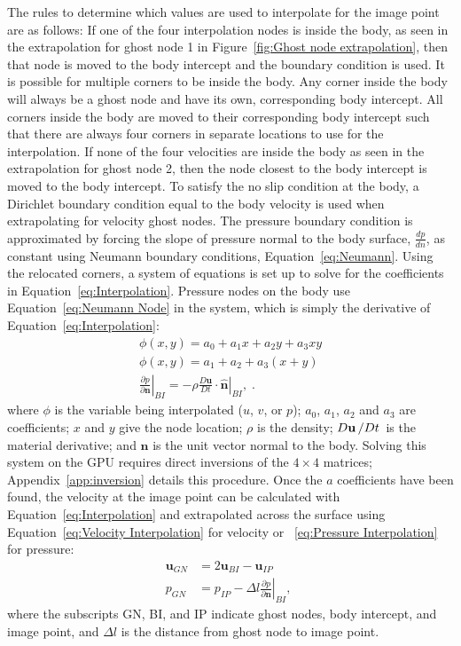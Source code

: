 \documentclass[preprint,12pt]{elsarticle}
\begin{document}
The rules to determine which values are used to interpolate for the image point are as follows:
If one of the four interpolation nodes is inside the body, as seen in the extrapolation for ghost node 1 in Figure~\ref{fig:Ghost node extrapolation}, then that node is moved to the body intercept and the boundary condition is used.
It is possible for multiple corners to be inside the body.
Any corner inside the body will always be a ghost node and have its own, corresponding body intercept.
All corners inside the body are moved to their corresponding body intercept such that there are always four corners in separate locations to use for the interpolation.
If none of the four velocities are inside the body as seen in the extrapolation for ghost node 2, then the node closest to the body intercept is moved to the body intercept.
To satisfy the no slip condition at the body, a Dirichlet boundary condition equal to the body velocity is used when extrapolating for velocity ghost nodes.
The pressure boundary condition is approximated by forcing the slope of pressure normal to the body surface, $\frac{dp}{dn}$, as constant using Neumann boundary conditions, Equation~\eqref{eq:Neumann}.
Using the relocated corners, a system of equations is set up to solve for the coefficients in Equation~\eqref{eq:Interpolation}.
Pressure nodes on the body use Equation~\eqref{eq:Neumann Node} in the system, which is simply the derivative of Equation~\eqref{eq:Interpolation}:
\begin{align}
\phi (x,y) = a_0 + a_1 x + a_2y + a_3 x y \label{eq:Interpolation} \\
\phi (x,y) = a_1 + a_2 + a_3 (x+y) \label{eq:Neumann Node} \\
\left. \frac{\partial p}{\partial \textbf{n}}\right|_{BI} = \left. -\rho \frac{D\textbf{u}}{Dt}\cdot \hat{\textbf{n}}\right|_{BI},
\label{eq:Neumann}\;.
\end{align}
where $\phi$ is the variable being interpolated ($u$, $v$, or $p$); $a_0$, $a_1$, $a_2$ and $a_3$ are coefficients; $x$ and $y$ give the node location;
$\rho$ is the density; $D\textbf{u}\left/Dt\right.$ is the material derivative; and $\textbf{n}$ is the unit vector normal to the body.
Solving this system on the GPU requires direct inversions of the $4 \times 4$ matrices;
Appendix~\ref{app:inversion} details this procedure.
Once the $a$ coefficients have been found, the velocity at the image point can be calculated with Equation~\eqref{eq:Interpolation} and extrapolated across the surface using Equation~\eqref{eq:Velocity Interpolation} for velocity or ~\eqref{eq:Pressure Interpolation} for pressure:
\begin{align}
\textbf{u}_{GN} &= 2\textbf{u}_{BI} - \textbf{u}_{IP} \label{eq:Velocity Interpolation} \\
p_{GN} &= p_{IP} - \Delta l \left. \frac{\partial p}{\partial \textbf{n}}\right|_{BI}, \; \label{eq:Pressure Interpolation}
\end{align}
where the subscripts GN, BI, and IP indicate ghost nodes, body intercept, and image point, and $\Delta l$ is the distance from ghost node to image point.
\end{document}
